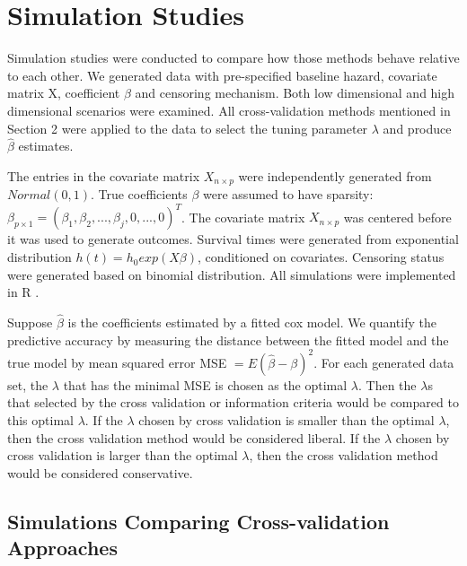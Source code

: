 

\section{Simulation Studies}


  Simulation studies were conducted to compare how those methods behave relative to each other. We generated data with pre-specified baseline hazard, covariate matrix X, coefficient $\beta$ and censoring mechanism. Both low dimensional and high dimensional scenarios were examined. All cross-validation methods mentioned in Section 2 were applied to the data to select the tuning parameter $\lambda$ and produce $\hat{\beta}$ estimates. %
  
 The entries in the covariate matrix $X_{n \times p}$ were independently generated from $Normal(0, 1)$. True coefficients $\beta$ were assumed to have sparsity: $\beta_{p\times 1} = (\beta_{1},\beta_{2}, ..., \beta_{j}, 0, ..., 0)^{T}$. The covariate matrix $X_{n \times p}$ was centered before it was used to generate outcomes. Survival times were generated from exponential distribution $h(t) = h_{0} exp(X\beta)$, conditioned on covariates. Censoring status were generated based on binomial distribution. All simulations were implemented in R \citep{R}.
  
  Suppose $\hat{\beta}$ is the coefficients estimated by a fitted cox model. We quantify the predictive accuracy by measuring the distance between the fitted model and the true model by mean squared error MSE $= E(\hat{\beta} - \beta)^2$. For each generated data set, the $\lambda$ that has the minimal MSE is chosen as the optimal $\lambda$. Then the $\lambda$s that selected by the cross validation or information criteria would be compared to this optimal $\lambda$. If the $\lambda$ chosen by cross validation is smaller than the optimal $\lambda$, then the cross validation method would be considered liberal. If the $\lambda$ chosen by cross validation is larger than the optimal $\lambda$, then the cross validation method would be considered conservative. 
 
    \subsection {Simulations Comparing Cross-validation Approaches}

